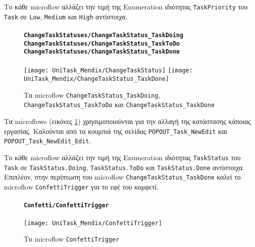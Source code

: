                 Το κάθε microflow αλλάζει την τιμή της Enumeration ιδιότητας \texttt{TaskPriority} του \texttt{Task} σε \texttt{Low}, \texttt{Medium} και \texttt{High} αντίστοιχα.

                \begin{figure}[H] \noindent
                    \paragraph{\texttt{ChangeTaskStatuses/ChangeTaskStatus\_TaskDoing} \\ \texttt{ChangeTaskStatuses/ChangeTaskStatus\_TaskToDo} \\ \texttt{ChangeTaskStatuses/ChangeTaskStatus\_TaskDone}}
                    \begin{center}
                        \texttt{[image: UniTask\_Mendix/ChangeTaskStatus]}
                        \texttt{[image: UniTask\_Mendix/ChangeTaskStatus\_TaskDone]}
                        \caption{\centering Τα microflow \texttt{ChangeTaskStatus\_TaskDoing}, \texttt{ChangeTaskStatus\_TaskToDo} και \texttt{ChangeTaskStatus\_TaskDone}}
                        \label{fig:unitask_ChangeTaskStatus}
                    \end{center}
                \end{figure}

                Τα microflows (εικόνες \ref{fig:unitask_ChangeTaskStatus}) χρησιμοποιούνται για την αλλαγή της κατάστασης κάποιας εργασίας. Καλούνται από τα κουμπιά της σελίδας \texttt{POPOUT\_Task\_NewEdit} και \texttt{POPOUT\_Task\_NewEdit\_Edit}.

                Το κάθε microflow αλλάζει την τιμή της Enumeration ιδιότητας \texttt{TaskStatus} του \texttt{Task} σε \texttt{TaskStatus.Doing}, \texttt{TaskStatus.ToDo} και \texttt{TaskStatus.Done} αντίστοιχα. Επιπλέον, στην περίπτωση του microflow \texttt{ChangeTaskStatus\_TaskDone} καλεί το microflow \texttt{ConfettiTrigger} για το εφέ του κομφετί.

                \begin{figure}[H] \noindent
                    \paragraph{\texttt{Confetti/ConfettiTrigger}}
                    \begin{center}
                        \texttt{[image: UniTask\_Mendix/ConfettiTrigger]}
                        \caption{\centering Το microflow \texttt{ConfettiTrigger}}
                        \label{fig:unitask_ConfettiTrigger}
                    \end{center}
                \end{figure}

